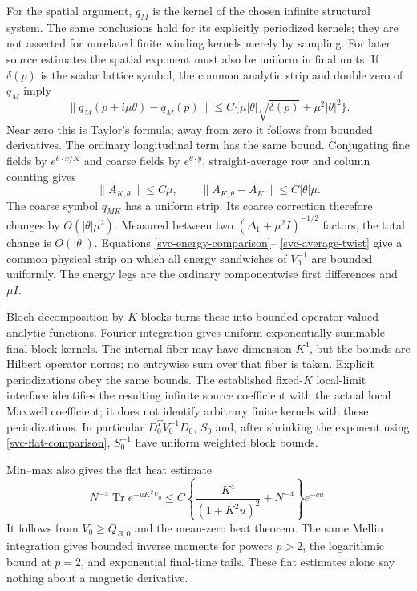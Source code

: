 For the spatial argument, $q_M$ is the kernel of the chosen infinite structural system. The same conclusions hold for its explicitly periodized kernels; they are not asserted for unrelated finite winding kernels merely by sampling. For later source estimates the spatial exponent must also be uniform
in final units. If $\delta(p)$ is the scalar lattice symbol, the common
analytic strip and double zero of $q_M$ imply
\begin{equation}
 \|q_M(p+i\mu\theta)-q_M(p)\|
 \le C\{\mu|\theta|\sqrt{\delta(p)}+\mu^2|\theta|^2\}.
 \label{svc-fine-twist}
\end{equation}
Near zero this is Taylor's formula; away from zero it follows from
bounded derivatives. The ordinary longitudinal term has the same bound.
Conjugating fine fields by $e^{\theta\cdot x/K}$ and coarse fields by
$e^{\theta\cdot y}$, straight-average row and column counting gives
\begin{equation}
 \|A_{K,\theta}\|\le C\mu,\qquad
 \|A_{K,\theta}-A_K\|\le C|\theta|\mu.
 \label{svc-average-twist}
\end{equation}
The coarse symbol $q_{MK}$ has a uniform strip. Its coarse correction
therefore changes by $O(|\theta|\mu^2)$.
Measured between two $(\Delta_1+\mu^2I)^{-1/2}$ factors, the total
change is $O(|\theta|)$. Equations \eqref{svc-energy-comparison}--
\eqref{svc-average-twist} give a common physical strip on which all
energy sandwiches of $V_0^{-1}$ are bounded uniformly. The energy legs
are the ordinary componentwise first differences and $\mu I$.

Bloch decomposition by $K$-blocks turns these into bounded
operator-valued analytic functions. Fourier integration gives uniform
exponentially summable final-block kernels. The internal fiber may
have dimension $K^4$, but the bounds are Hilbert operator norms; no
entrywise sum over that fiber is taken. Explicit periodizations obey the same bounds. The established fixed-$K$ local-limit interface identifies the resulting infinite source coefficient with the actual local Maxwell coefficient; it does not identify arbitrary finite kernels with these periodizations. In particular $D_0^TV_0^{-1}D_0$, $S_0$ and, after shrinking
the exponent using \eqref{svc-flat-comparison}, $S_0^{-1}$ have uniform
weighted block bounds.

Min--max also gives the flat heat estimate
\begin{equation}
 N^{-4}\operatorname{Tr}e^{-uK^2V_0}
 \le C\left\{\frac{K^4}{(1+K^2u)^2}+N^{-4}\right\}e^{-cu}.
 \label{svc-flat-heat}
\end{equation}
It follows from $V_0\ge Q_{B,0}$ and the mean-zero heat theorem.
The same Mellin integration gives bounded inverse moments for powers
$p>2$, the logarithmic bound at $p=2$, and exponential final-time tails.
These flat estimates alone say nothing about a magnetic derivative.

